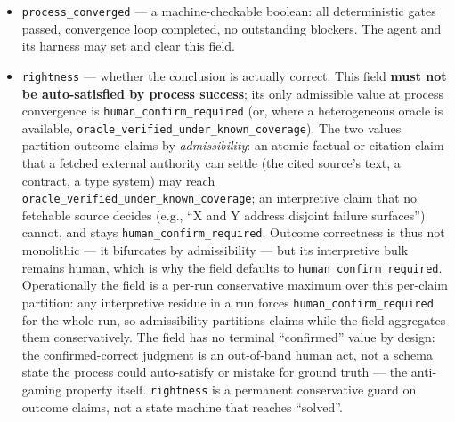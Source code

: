 \documentclass[
  11pt,
]{article}
\providecommand{\tightlist}{%
  \setlength{\itemsep}{0pt}\setlength{\parskip}{0pt}}
\begin{document}
\begin{itemize}
\tightlist
\item
  \texttt{process\_converged} --- a machine-checkable boolean: all
  deterministic gates passed, convergence loop completed, no outstanding
  blockers. The agent and its harness may set and clear this field.
\item
  \texttt{rightness} --- whether the conclusion is actually correct.
  This field \textbf{must not be auto-satisfied by process success}; its
  only admissible value at process convergence is
  \texttt{human\_confirm\_required} (or, where a heterogeneous oracle is
  available, \texttt{oracle\_verified\_under\_known\_coverage}). The two
  values partition outcome claims by \emph{admissibility}: an atomic
  factual or citation claim that a fetched external authority can settle
  (the cited source's text, a contract, a type system) may reach
  \texttt{oracle\_verified\_under\_known\_coverage}; an interpretive
  claim that no fetchable source decides (e.g., ``X and Y address
  disjoint failure surfaces'') cannot, and stays
  \texttt{human\_confirm\_required}. Outcome correctness is thus not
  monolithic --- it bifurcates by admissibility --- but its interpretive
  bulk remains human, which is why the field defaults to
  \texttt{human\_confirm\_required}. Operationally the field is a
  per-run conservative maximum over this per-claim partition: any
  interpretive residue in a run forces \texttt{human\_confirm\_required}
  for the whole run, so admissibility partitions claims while the field
  aggregates them conservatively. The field has no terminal
  ``confirmed'' value by design: the confirmed-correct judgment is an
  out-of-band human act, not a schema state the process could
  auto-satisfy or mistake for ground truth --- the anti-gaming property
  itself. \texttt{rightness} is a permanent conservative guard on
  outcome claims, not a state machine that reaches ``solved''.
\end{itemize}
\end{document}
